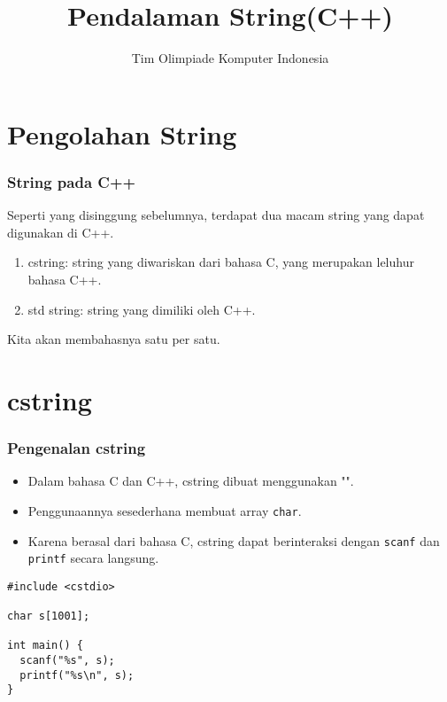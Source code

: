 

\title{Pendalaman String\newline (C++)}
\author{Tim Olimpiade Komputer Indonesia}
\date{}



\begin{frame}
\titlepage
\end{frame}

\section{Pengolahan String}
\frame{\sectionpage}

\begin{frame}
\frametitle{String pada C++}
Seperti yang disinggung sebelumnya, terdapat dua macam string yang dapat digunakan di C++.
\begin{enumerate}
  \item cstring: string yang diwariskan dari bahasa C, yang merupakan leluhur bahasa C++.
  \item std string: string yang dimiliki oleh C++.
\end{enumerate}
Kita akan membahasnya satu per satu.
\end{frame}

\section{cstring}
\frame{\sectionpage}


\begin{frame}[fragile]
\frametitle{Pengenalan cstring}
\begin{itemize}
  \item Dalam bahasa C dan C++, cstring dibuat menggunakan "".
  \item Penggunaannya sesederhana membuat array \texttt{char}.
  \item Karena berasal dari bahasa C, cstring dapat berinteraksi dengan \texttt{scanf} dan \texttt{printf} secara langsung.
\end{itemize}

\begin{lstlisting}
#include <cstdio>

char s[1001];

int main() {
  scanf("%s", s);
  printf("%s\n", s);
}
\end{lstlisting}
\end{frame}

